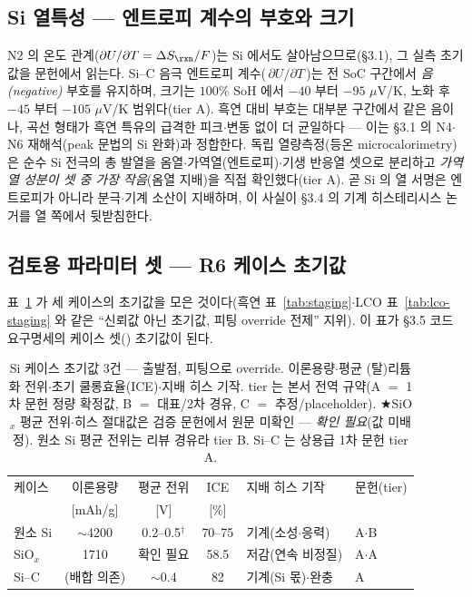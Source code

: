 \subsection{Si 열특성 --- 엔트로피 계수의 부호와 크기}\label{ssec:si-thermal}
N2 의 온도 관계($\partial U/\partial T=\Delta S_\rxn/F$)는 Si 에서도 살아남으므로(§3.1), 그 실측 초기값을
문헌에서 읽는다. Si--C 음극 엔트로피 계수(\,$\partial U/\partial T$\,)는 전 SoC 구간에서 \emph{음(negative)}
부호를 유지하며, 크기는 $100\%$ SoH 에서 $-40$ 부터 $-95$ $\mu$V/K, 노화 후 $-45$ 부터 $-105$ $\mu$V/K
범위다(tier A\cite{bohm_entropy2024}). 흑연 대비 부호는 대부분 구간에서 같은 음이나, 곡선 형태가 흑연
특유의 급격한 피크$\cdot$변동 없이 더 균일하다 --- 이는 §3.1 의 N4$\cdot$N6 재해석(peak 문법의 Si 완화)과
정합한다. 독립 열량측정(등온 microcalorimetry)은 순수 Si 전극의 총 발열을 옴열$\cdot$가역열(엔트로피)$\cdot$기생
반응열 셋으로 분리하고 \emph{가역열 성분이 셋 중 가장 작음}(옴열 지배)을 직접 확인했다(tier
A\cite{arnot_si2021}). 곧 Si 의 열 서명은 엔트로피가 아니라 분극$\cdot$기계 소산이 지배하며, 이 사실이
§3.4 의 기계 히스테리시스 논거를 열 쪽에서 뒷받침한다.

\subsection{검토용 파라미터 셋 --- R6 케이스 초기값}\label{ssec:si-paramset}
표~\ref{tab:si-cases} 가 세 케이스의 초기값을 모은 것이다(흑연 표~\ref{tab:staging}$\cdot$LCO
표~\ref{tab:lco-staging} 와 같은 ``신뢰값 아닌 초기값, 피팅 override 전제'' 지위). 이 표가 §3.5 코드
요구명세의 케이스 셋() 초기값이 된다.

\begin{table}[t]
\centering\footnotesize
\renewcommand{\arraystretch}{1.3}
\caption{Si 케이스 초기값 3건 --- 출발점, 피팅으로 override. 이론용량$\cdot$평균 (탈)리튬화 전위$\cdot$초기
쿨롱효율(ICE)$\cdot$지배 히스 기작. tier 는 본서 전역 규약(A $=$ 1차 문헌 정량 확정값, B $=$ 대표/2차 경유,
C $=$ 추정/placeholder). ★SiO$_x$ 평균 전위$\cdot$히스 절대값은 검증 문헌에서 원문 미확인 --- \emph{확인
필요}(값 미배정). 원소 Si 평균 전위는 리뷰 경유라 tier B. Si--C 는 상용급 1차 문헌 tier A.}
\label{tab:si-cases}
\begin{tabular}{l c c c l l}
\toprule
케이스 & 이론용량 & 평균 전위 & ICE & 지배 히스 기작 & 문헌(tier) \\
 & [mAh/g] & [V] & [\%] &  &  \\
\midrule
원소 Si   & $\sim$4200 & 0.2--0.5$^\dagger$ & 70--75 & 기계(소성$\cdot$응력) & \cite{wen_huggins1981}A$\cdot$\cite{obrovac_chevrier2014}B \\
SiO$_x$   & 1710       & 확인 필요          & 58.5   & 저감(연속 비정질)     & \cite{zhang_sio2018}A$\cdot$\cite{yom_sio2016}A \\
Si--C     & (배합 의존) & $\sim$0.4          & 82     & 기계(Si 몫)$\cdot$완충 & \cite{andersen_sic2019}A \\
\bottomrule
\end{tabular}
\end{table}

